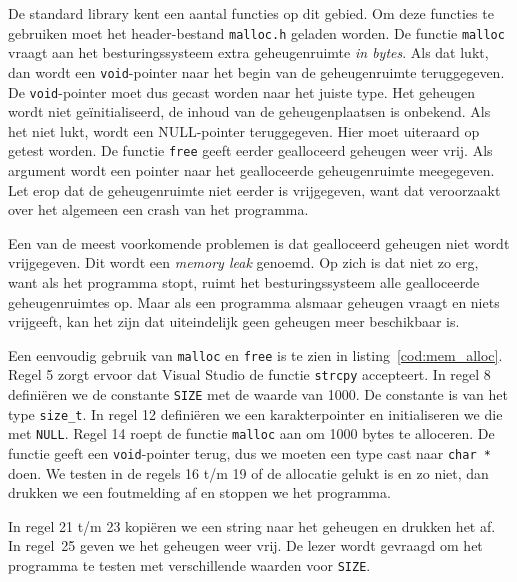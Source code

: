 De standard library kent een aantal functies op dit gebied. Om deze functies te gebruiken moet het header-bestand \texttt{malloc.h} geladen worden. De functie \texttt{malloc} vraagt aan het besturingssysteem extra geheugenruimte \textsl{in bytes}. Als dat lukt, dan wordt een \texttt{void}-pointer naar het begin van de geheugenruimte teruggegeven. De \texttt{void}-pointer moet dus gecast worden naar het juiste type. Het geheugen wordt niet geïnitialiseerd, de inhoud van de geheugenplaatsen is onbekend. Als het niet lukt, wordt een NULL-pointer teruggegeven. Hier moet uiteraard op getest worden. De functie \texttt{free} geeft eerder gealloceerd geheugen weer vrij. Als argument wordt een pointer naar het gealloceerde geheugenruimte meegegeven. Let erop dat de geheugenruimte niet eerder is vrijgegeven, want dat veroorzaakt over het algemeen een crash van het programma.

Een van de meest voorkomende problemen is dat gealloceerd geheugen niet wordt vrijgegeven. Dit wordt een \textsl{memory leak} genoemd. Op zich is dat niet zo erg, want als het programma stopt, ruimt het besturingssysteem alle gealloceerde geheugenruimtes op. Maar als een programma alsmaar geheugen vraagt en niets vrijgeeft, kan het zijn dat uiteindelijk geen geheugen meer beschikbaar is.

Een eenvoudig gebruik van \texttt{malloc} en \texttt{free} is te zien in listing~\ref{cod:mem_alloc}. Regel 5 zorgt ervoor dat Visual Studio de functie \texttt{strcpy} accepteert. In regel 8 definiëren we de constante \texttt{SIZE} met de waarde van 1000. De constante is van het type \texttt{size\_t}. In regel 12 definiëren we een karakterpointer en initialiseren we die met \texttt{NULL}. Regel 14 roept de functie \texttt{malloc} aan om 1000 bytes te alloceren. De functie geeft een \texttt{void}-pointer terug, dus we moeten een type cast naar \texttt{char *} doen. We testen in de regels 16 t/m 19 of de allocatie gelukt is en zo niet, dan drukken we een foutmelding af en stoppen we het programma.


In regel 21 t/m 23 kopiëren we een string naar het geheugen en drukken het af. In regel~25 geven we het geheugen weer vrij. De lezer wordt gevraagd om het programma te testen met verschillende waarden voor \texttt{SIZE}.

